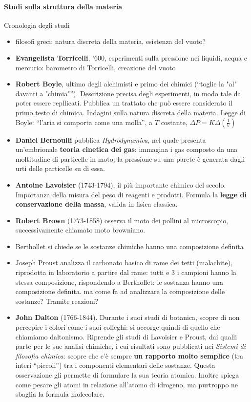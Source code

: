 \paragraph{Studi sulla struttura della materia} Cronologia degli studi
\begin{itemize}
    \item filosofi greci: natura discreta della materia, esistenza del vuoto? 
    \item \textbf{Evangelista Torricelli}, '600, esperimenti sulla pressione nei liquidi, acqua e mercurio: barometro di Torricelli, creazione del vuoto
    \item \textbf{Robert Boyle}, ultimo degli alchimisti e primo dei chimici (``toglie la "al" davanti a "chimia"''). Descrizione precisa degli esperimenti, in modo tale da poter essere repllicati. Pubblica un trattato che può essere considerato il primo testo di chimica.
        Indagini sulla natura discreta della materia. Legge di Boyle: ``l'aria si comporta come una molla'', a $T$ costante, $\Delta P = K \Delta\left(\frac{1}{V} \right)$
    \item \textbf{Daniel Bernoulli} pubblica \textit{Hydrodynamica}, nel quale presenta un'embrionale \textbf{teoria cinetica dei gas}: immagina i gas composto da una moltitudine di particelle in moto; la pressione su una parete è generata dagli urti delle particelle su di essa.
    \item \textbf{Antoine Lavoisier} (1743-1794), il più importante chimico del secolo. Importanza della misura del peso di reagenti e prodotti. Formula la \textbf{legge di conservazione della massa}, valida in fisica classica.
    \item \textbf{Robert Brown} (1773-1858) osserva il moto dei pollini al microscopio, successivamente chiamato moto browniano.
    \item Berthollet si chiede se le sostanze chimiche hanno una composizione definita
    \item Joseph Proust analizza il carbonato basico di rame dei tetti (malachite), riprodotta in laboratorio a partire dal rame: tutti e 3 i campioni hanno la stessa composizione, rispondendo a Berthollet: le sostanza hanno una composizione definita.
        {\color{red} ma come fa ad analizzare la composizione delle sostanze? Tramite reazioni?}
    \item \textbf{John Dalton} (1766-1844). Durante i suoi studi di botanica, scopre di non percepire i colori come i suoi colleghi: si accorge quindi di quello che chiamiamo daltonismo. Riprende gli studi di Lavoisier e Proust, dai qualli parte per le sue analisi chimiche, i cui risultati sono pubblicati nei \textit{Sistemi di filosofia chimica}: scopre che c'è sempre \textbf{un rapporto molto semplice} (tra interi ``piccoli'') tra i componenti elementari delle sostanze. Questa osservazione gli permette di formulare la sua teoria atomica. Inoltre spiega come pesare gli atomi in relazione all'atomo di idrogeno, ma purtroppo ne sbaglia la formula molecolare.

\end{itemize}

